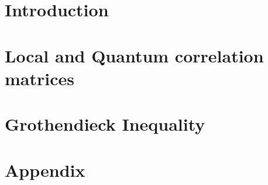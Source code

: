 \newpage
\section{Introduction} %
	\vspace{8pt}
	


\section{Local and Quantum correlation matrices} %
	\vspace{8pt}

	

\section{Grothendieck Inequality} %
	

\section*{Appendix}
		



	

